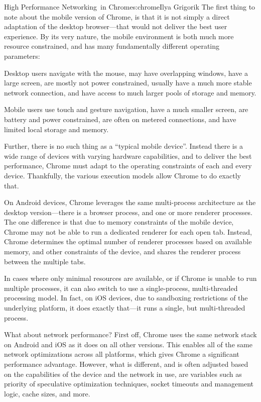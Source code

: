 \begin{aosachapter}{High Performance Networking~in Chrome}{s:chrome}{Ilya Grigorik}
The first thing to note about the mobile version of Chrome, is that it
is not simply a direct adaptation of the desktop browser---that would
not deliver the best user experience. By its very nature, the mobile
environment is both much more resource constrained, and has many
fundamentally different operating parameters:

\begin{aosaitemize}

\item
  Desktop users navigate with the mouse, may have overlapping windows,
  have a large screen, are mostly not power constrained, usually have a
  much more stable network connection, and have access to much larger
  pools of storage and memory.
\item
  Mobile users use touch and gesture navigation, have a much smaller
  screen, are battery and power constrained, are often on metered
  connections, and have limited local storage and memory.
\end{aosaitemize}

Further, there is no such thing as a ``typical mobile device''. Instead
there is a wide range of devices with varying hardware capabilities, and
to deliver the best performance, Chrome must adapt to the operating
constraints of each and every device. Thankfully, the various execution
models allow Chrome to do exactly that.

On Android devices, Chrome leverages the same multi-process architecture
as the desktop version---there is a browser process, and one or more
renderer processes. The one difference is that due to memory constraints
of the mobile device, Chrome may not be able to run a dedicated renderer
for each open tab. Instead, Chrome determines the optimal number of
renderer processes based on available memory, and other constraints of
the device, and shares the renderer process between the multiple tabs.

In cases where only minimal resources are available, or if Chrome is
unable to run multiple processes, it can also switch to use a
single-process, multi-threaded processing model. In fact, on iOS
devices, due to sandboxing restrictions of the underlying platform, it
does exactly that---it runs a single, but multi-threaded process.

What about network performance? First off, Chrome uses the same network
stack on Android and iOS as it does on all other versions. This enables
all of the same network optimizations across all platforms, which gives
Chrome a significant performance advantage. However, what is different,
and is often adjusted based on the capabilities of the device and the
network in use, are variables such as priority of speculative
optimization techniques, socket timeouts and management logic, cache
sizes, and more.


\end{aosachapter}
